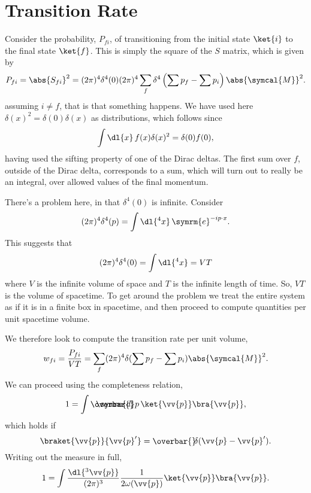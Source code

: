 \documentclass[fleqn]{NotesClass}
\newcommand{\e}{\symrm{e}}
\newcommand\dbar{\ThisStyle{\ensurestackMath{%
            \stackengine{-.3\LMpt}{\SavedStyle \symrm{d}}{\SavedStyle\overbar{}%
                \mkern2.25mu}{O}{r}{F}{F}{L}}}}
\newcommand{\invariantmeasure}[1]{\dbar #1}
\newcommand\bardelta{\ThisStyle{\ensurestackMath{%
            \stackengine{-.3\LMpt}{\SavedStyle \delta}{\SavedStyle\overbar{}%
                \mkern4.5mu}{O}{r}{F}{F}{L}}}}
\newcommand{\amplitude}{\symcal{M}}
\begin{document}
    \section{Transition Rate}
    Consider the probability, \(P_{fi}\), of transitioning from the initial state \(\ket{i}\) to the final state \(\ket{f}\).
    This is simply the square of the \(S\) matrix, which is given by
    \begin{equation}
        P_{fi} = \abs{S_{fi}}^2 = (2\pi)^4\delta^4(0)(2\pi)^4 \sum_f \delta^4\left( \sum p_f - \sum p_i \right) \abs{\amplitude}^2.
    \end{equation}
    assuming \(i \ne f\), that is that something happens.
    We have used here \(\delta(x)^2 = \delta(0)\delta(x)\) as distributions, which follows since
    \begin{equation}
        \int \dl{x} \, f(x) \delta(x)^2 = \delta(0) f(0),
    \end{equation}
    having used the sifting property of one of the Dirac deltas.
    The first sum over \(f\), outside of the Dirac delta, corresponds to a sum, which will turn out to really be an integral, over allowed values of the final momentum.
    
    There's a problem here, in that \(\delta^4(0)\) is infinite.
    Consider
    \begin{equation}
        (2\pi)^4 \delta^4(p) = \int \dl{^4x}  \, \e^{-ip\cdot x}.
    \end{equation}
    This suggests that
    \begin{equation}
        (2\pi)^4\delta^4(0) = \int \dl{^4x} = VT
    \end{equation}
    where \(V\) is the infinite volume of space and \(T\) is the infinite length of time.
    So, \(VT\) is the volume of spacetime.
    To get around the problem we treat the entire system as if it is in a finite box in spacetime, and then proceed to compute quantities per unit spacetime volume.
    
    We therefore look to compute the transition rate per unit volume,
    \begin{equation}
        w_{fi} = \frac{P_{fi}}{VT} = \sum_f (2\pi)^4\delta(\sum p_f - \sum p_i) \abs{\amplitude}^2.
    \end{equation}
    We can proceed using the completeness relation,
    \begin{equation}
        1 = \int \invariantmeasure{p} \, \ket{\vv{p}}\bra{\vv{p}},
    \end{equation}
    which holds if
    \begin{equation}
        \braket{\vv{p}}{\vv{p}'} = \bardelta(\vv{p} - \vv{p}').
    \end{equation}
    Writing out the measure in full,
    \begin{equation}
        1 = \int \frac{\dl{^3\vv{p}}}{(2\pi)^3} \frac{1}{2\omega(\vv{p})} \ket{\vv{p}} \bra{\vv{p}}.
    \end{equation}
    
\end{document}

